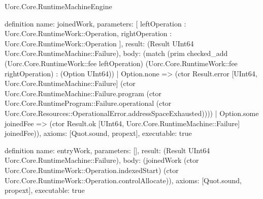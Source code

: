 \begin{lexlean}{Uorc.Core.RuntimeMachineEngine}
\begin{semanticmodule}
definition{
  name: joinedWork,
  parameters: [
    leftOperation : Uorc.Core.RuntimeWork::Operation,
    rightOperation : Uorc.Core.RuntimeWork::Operation
  ],
  result: (Result UInt64 Uorc.Core.RuntimeMachine::Failure),
  body: (match (prim checked_add (Uorc.Core.RuntimeWork::fee leftOperation) (Uorc.Core.RuntimeWork::fee rightOperation) : (Option UInt64))
    | Option.none => (ctor Result.error [UInt64, Uorc.Core.RuntimeMachine::Failure] (ctor Uorc.Core.RuntimeMachine::Failure.program (ctor Uorc.Core.RuntimeProgram::Failure.operational (ctor Uorc.Core.Resources::OperationalError.addressSpaceExhausted))))
    | Option.some joinedFee => (ctor Result.ok [UInt64, Uorc.Core.RuntimeMachine::Failure] joinedFee)),
  axioms: [Quot.sound, propext],
  executable: true
}

definition{
  name: entryWork,
  parameters: [],
  result: (Result UInt64 Uorc.Core.RuntimeMachine::Failure),
  body: (joinedWork (ctor Uorc.Core.RuntimeWork::Operation.indexedStart) (ctor Uorc.Core.RuntimeWork::Operation.controlAllocate)),
  axioms: [Quot.sound, propext],
  executable: true
}


\end{semanticmodule}
\end{lexlean}
